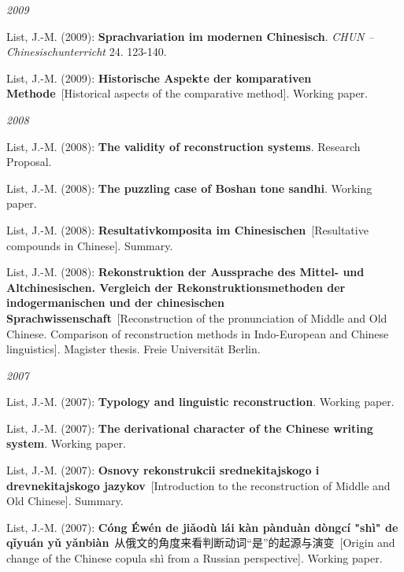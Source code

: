 \par
\noindent\textit{2009}\par\nopagebreak\vspace{0.25cm}
\nopagebreak\noindent List, J.-M. (2009): \textbf{Sprachvariation im modernen Chinesisch}. \textit{CHUN -- Chinesischunterricht} 24. 123-140.\vspace{0.25cm}
\par
\nopagebreak\noindent List, J.-M. (2009): \textbf{Historische Aspekte der komparativen Methode}\ [Historical aspects of the comparative method]. Working paper.\vspace{0.25cm}
\par
\noindent\textit{2008}\par\nopagebreak\vspace{0.25cm}
\nopagebreak\noindent List, J.-M. (2008): \textbf{The validity of reconstruction systems}. Research Proposal.\vspace{0.25cm}
\par
\nopagebreak\noindent List, J.-M. (2008): \textbf{The puzzling case of Boshan tone sandhi}. Working paper.\vspace{0.25cm}
\par
\nopagebreak\noindent List, J.-M. (2008): \textbf{Resultativkomposita im Chinesischen}\ [Resultative compounds in Chinese]. Summary.\vspace{0.25cm}
\par
\nopagebreak\noindent List, J.-M. (2008): \textbf{Rekonstruktion der Aussprache des Mittel- und Altchinesischen}\textbf{. Vergleich der Rekonstruktionsmethoden der indogermanischen und der chinesischen Sprachwissenschaft}\ [Reconstruction of the pronunciation of Middle and Old Chinese. Comparison of reconstruction methods in Indo-European and Chinese linguistics]. Magister thesis. Freie Universität Berlin.\vspace{0.25cm}
\par
\noindent\textit{2007}\par\nopagebreak\vspace{0.25cm}
\nopagebreak\noindent List, J.-M. (2007): \textbf{Typology and linguistic reconstruction}. Working paper.\vspace{0.25cm}
\par
\nopagebreak\noindent List, J.-M. (2007): \textbf{The derivational character of the Chinese writing system}. Working paper.\vspace{0.25cm}
\par
\nopagebreak\noindent List, J.-M. (2007): \textbf{Osnovy rekonstrukcii srednekitajskogo i drevnekitajskogo jazykov}\ [Introduction to the reconstruction of Middle and Old Chinese]. Summary.\vspace{0.25cm}
\par
\nopagebreak\noindent List, J.-M. (2007): \textbf{Cóng Éwén de jiǎodù lái kàn pànduàn dòngcí "shì" de qǐyuán yǔ yǎnbiàn}\ {\hana 从俄文的角度来看判断动词“是”的起源与演变}\ [Origin and change of the Chinese copula shì from a Russian perspective]. Working paper.\vspace{0.25cm}
\par
